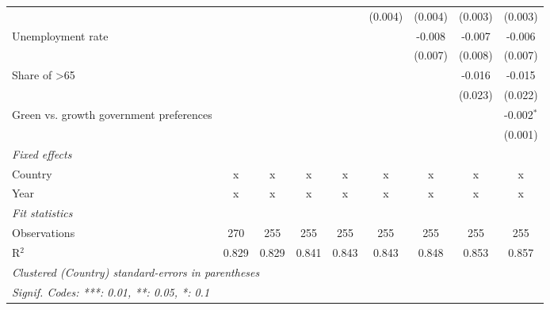\begin{table}[htbp]
\begin{tabular}{lcccccccc}
                                                        &         &         &             &              & (0.004)      & (0.004)      & (0.003)       & (0.003)\\   
      Unemployment rate                                 &         &         &             &              &              & -0.008       & -0.007        & -0.006\\   
                                                        &         &         &             &              &              & (0.007)      & (0.008)       & (0.007)\\   
      Share of >65                                      &         &         &             &              &              &              & -0.016        & -0.015\\   
                                                        &         &         &             &              &              &              & (0.023)       & (0.022)\\   
      Green vs. growth government preferences           &         &         &             &              &              &              &               & -0.002$^{*}$\\   
                                                        &         &         &             &              &              &              &               & (0.001)\\   
      \emph{Fixed effects}\\
      Country                                           & x       & x       & x           & x            & x            & x            & x             & x\\  
      Year                                              & x       & x       & x           & x            & x            & x            & x             & x\\  
      \midrule \emph{Fit statistics}\\
      Observations                                      & 270     & 255     & 255         & 255          & 255          & 255          & 255           & 255\\  
      R$^2$                                             & 0.829   & 0.829   & 0.841       & 0.843        & 0.843        & 0.848        & 0.853         & 0.857\\  
      \midrule
      \multicolumn{9}{l}{\emph{Clustered (Country) standard-errors in parentheses}}\\
      \multicolumn{9}{l}{\emph{Signif. Codes: ***: 0.01, **: 0.05, *: 0.1}}\\
   \end{tabular}
\end{table}



